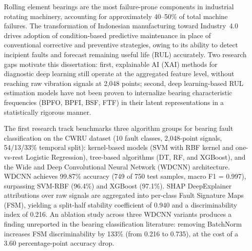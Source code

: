 
\begin{abstracten}

Rolling element bearings are the most failure-prone components in industrial
rotating machinery, accounting for approximately 40--50\% of total machine
failures.
The transformation of Indonesian manufacturing toward Industry~4.0 drives
adoption of condition-based predictive maintenance in place of conventional
corrective and preventive strategies, owing to its ability to detect
incipient faults and forecast remaining useful life (RUL) accurately.
Two research gaps motivate this dissertation: first, explainable AI (XAI)
methods for diagnostic deep learning still operate at the aggregated feature
level, without reaching raw vibration signals at 2,048 points; second,
deep learning-based RUL estimation models have not been proven to
internalize bearing characteristic frequencies (BPFO, BPFI, BSF, FTF)
in their latent representations in a statistically rigorous manner.

The first research track benchmarks three algorithm groups for bearing
fault classification on the CWRU dataset (10 fault classes, 2,048-point
signals, 54/13/33\% temporal split): kernel-based models (SVM with RBF
kernel and one-vs-rest Logistic Regression), tree-based algorithms (DT,
RF, and XGBoost), and the Wide and Deep Convolutional Neural Network
(WDCNN) architecture.
WDCNN achieves 99.87\% accuracy (749 of 750 test samples, macro F1 = 0.997),
surpassing SVM-RBF (96.4\%) and XGBoost (97.1\%).
SHAP DeepExplainer attributions over raw signals are aggregated into
per-class Fault Signature Maps (FSM), yielding a split-half stability
coefficient of 0.940 and a discriminability index of 0.216.
An ablation study across three WDCNN variants produces a finding unreported
in the bearing classification literature: removing BatchNorm increases FSM
discriminability by 133\% (from 0.216 to 0.735), at the cost of a 3.60
percentage-point accuracy drop.


\end{abstracten}
